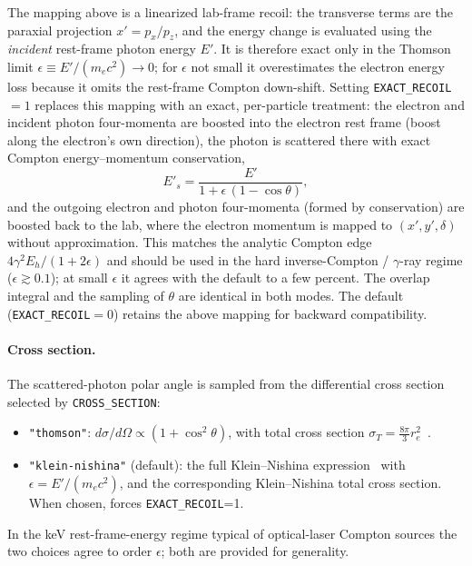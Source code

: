 The mapping above is a linearized lab-frame recoil: the transverse terms
are the paraxial projection $x'=p_x/p_z$, and the energy change is evaluated using
the {\em incident} rest-frame photon energy $E'$.  It is therefore exact only in
the Thomson limit $\epsilon\equiv E'/(m_e c^2)\to 0$; for $\epsilon$ not small it
overestimates the electron energy loss because it omits the rest-frame Compton
down-shift.  Setting \verb|EXACT_RECOIL|$=1$ replaces this mapping with an exact,
per-particle treatment: the electron and incident photon four-momenta are boosted
into the electron rest frame (boost along the electron's own direction), the
photon is scattered there with exact Compton energy--momentum conservation,
\begin{equation}
E'_s = \frac{E'}{1+\epsilon\,(1-\cos\theta)},
\end{equation}
and the outgoing electron and photon four-momenta (formed by conservation) are
boosted back to the lab, where the electron momentum is mapped to $(x',y',\delta)$
without approximation.  This matches the analytic Compton edge
$4\gamma^2 E_h/(1+2\epsilon)$ and should be used in the hard inverse-Compton /
$\gamma$-ray regime ($\epsilon\gtrsim 0.1$); at small $\epsilon$ it agrees with the
default to a few percent.  The overlap integral and the sampling of $\theta$ are
identical in both modes.  The default (\verb|EXACT_RECOIL|$=0$) retains the
above mapping for backward compatibility.

\paragraph{Cross section.}
The scattered-photon polar angle is sampled from the differential cross section
selected by \verb|CROSS_SECTION|:
\begin{itemize}
\item \verb|"thomson"|: $d\sigma/d\Omega \propto (1+\cos^2\theta)$, with total
  cross section $\sigma_T = \frac{8\pi}{3}r_e^2$~\cite{Jackson}.
\item \verb|"klein-nishina"| (default): the full Klein--Nishina
  expression~\cite{KleinNishina1929} with $\epsilon = E'/(m_e c^2)$, and the
  corresponding Klein--Nishina total cross section.
  When chosen, forces \verb|EXACT_RECOIL|=1.
\end{itemize}
In the keV rest-frame-energy regime typical of optical-laser Compton sources the
two choices agree to order $\epsilon$; both are provided for generality.


